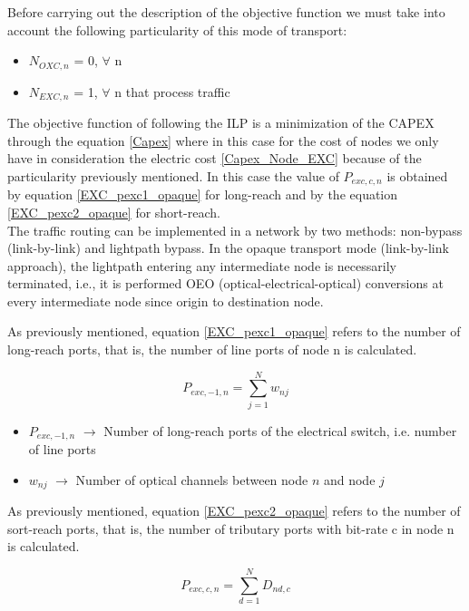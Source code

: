 Before carrying out the description of the objective function we must take into account the following particularity of this mode of transport:
\begin{itemize}
  \item $N_{OXC,n}$ = 0, \quad $\forall$ n
  \item $N_{EXC,n}$ = 1, \quad $\forall$ n that process traffic
\end{itemize}


\vspace{11pt}
The objective function of following the ILP is a minimization of the CAPEX through the equation \ref{Capex} where in this case for the cost of nodes we only have in consideration the electric cost \ref{Capex_Node_EXC} because of the particularity previously mentioned.
In this case the value of $P_{exc,c,n}$ is obtained by equation \ref{EXC_pexc1_opaque} for long-reach and by the equation \ref{EXC_pexc2_opaque} for short-reach.\\

The traffic routing can be implemented in a network by two methods: non-bypass (link-by-link) and lightpath bypass. In the opaque transport mode (link-by-link approach), the lightpath entering any intermediate node is necessarily terminated, i.e., it is performed OEO (optical-electrical-optical) conversions at every intermediate node since origin to destination node.

\newpage
As previously mentioned, equation \ref{EXC_pexc1_opaque} refers to the number of long-reach ports, that is, the number of line ports of node n is calculated.

\begin{equation}
P_{exc,-1,n} = \sum_{j=1}^{N} w_{nj}
\label{EXC_pexc1_opaque}
\end{equation}

\begin{itemize}
\item{$P_{exc,-1,n}$	$\rightarrow$	Number of long-reach ports of the electrical switch, i.e. number of line ports}
\item{$w_{nj}$			$\rightarrow$	Number of optical channels between node $n$ and node $j$}
\end{itemize}

\vspace{11pt}
As previously mentioned, equation \ref{EXC_pexc2_opaque} refers to the number of sort-reach ports, that is, the number of tributary ports with bit-rate c in node n is calculated.

\begin{equation}
P_{exc,c,n} = \sum_{d=1}^{N} D_{nd,c}
\label{EXC_pexc2_opaque}
\end{equation}

